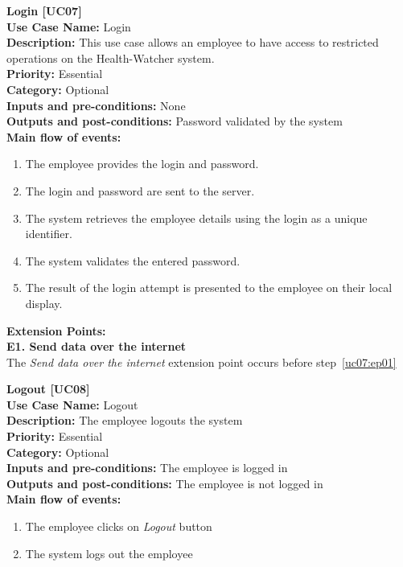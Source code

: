 \documentclass[11pt,twoside]{article}
\begin{document}
\textbf{Login [UC07]}\\
\textbf{Use Case Name:} Login\\
\textbf{Description:} This use case allows an employee to have access to restricted operations on
the Health-Watcher system.\\
\textbf{Priority:} Essential \\ 
\textbf{Category:} Optional \\ 
\textbf{Inputs and pre-conditions:} None\\ 
\textbf{Outputs and post-conditions:} Password validated by the system\\  
\textbf{Main flow of events:}\\
\begin{enumerate}
\item The employee provides the login and password.
\item \label{uc07:ep01}The login and password are sent to the server.
\item The system retrieves the employee details using the login as a unique
identifier.
\item The system validates the entered password.
\item The result of the login attempt is presented to the employee on their
local display.
\end{enumerate}

\textbf{Extension Points:}\\
\textbf{E1. Send data over the internet}\\
The \textit{Send data over the internet} extension point occurs before step~\ref{uc07:ep01}


\textbf{Logout [UC08]}\\
\textbf{Use Case Name:} Logout\\
\textbf{Description:} The employee logouts the system\\
\textbf{Priority:} Essential \\ 
\textbf{Category:} Optional \\ 
\textbf{Inputs and pre-conditions:} The employee is logged in\\ 
\textbf{Outputs and post-conditions:}  The employee is not logged in\\  
\textbf{Main flow of events:}\\
\begin{enumerate}
\item The employee clicks on \textit{Logout} button
\item The system logs out the employee
\end{enumerate}
\end{document}
